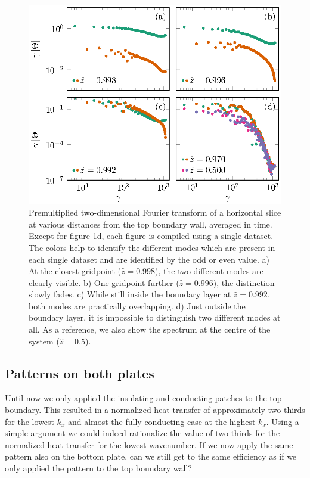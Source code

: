 \documentclass{jfm}
\begin{document}
\begin{figure}
\centering
\includegraphics{fig7.eps}
\caption{%
Premultiplied two-dimensional Fourier transform of a horizontal slice at
various distances from the top boundary wall, averaged in time.  Except
for figure \ref{figure7}d, each figure is compiled using a single dataset.
The colors help to identify the different modes which are present in each
single dataset and are identified by the odd or even value.  a) At the closest
gridpoint ($\hat{z}=0.998$), the two different modes are clearly visible.  b)
One gridpoint further ($\hat{z}=0.996$), the distinction slowly fades.  c)
While still inside the boundary layer at $\hat{z}=0.992$, both modes are
practically overlapping.  d) Just outside the boundary layer, it is impossible
to distinguish two different modes at all.  As a reference, we also show the
spectrum at the centre of the system ($\hat{z}=0.5$).  }
\label{figure7}
\end{figure}

%
\subsection{Patterns on both plates}\label{BothPlates}
Until now we only applied the insulating and conducting patches to the top
boundary.  This resulted in a normalized heat transfer of approximately
two-thirds for the lowest $k_x$ and almost the fully conducting case at the
highest $k_x$.  Using a simple argument we could indeed rationalize the value
of two-thirds for the normalized heat transfer for the lowest wavenumber.  If
we now apply the same pattern also on the bottom plate, can we still get to
the same efficiency as if we only applied the pattern to the top boundary
wall?
\end{document}
